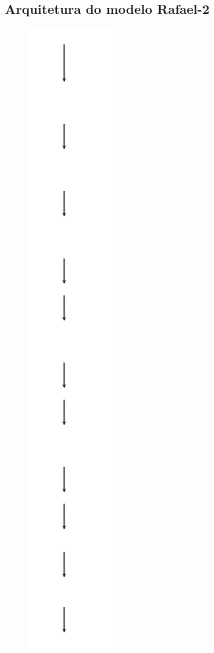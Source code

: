 \begin{anexosenv}
\partanexos

\chapter{Arquitetura do modelo Rafael-2}
\begin{figure}[htb]
	\begin{center}
		\includegraphics[scale=0.25]{Imagens/rafael_student_r8g8b8_tflite}

\end{center}
\end{figure}
\end{anexosenv}
